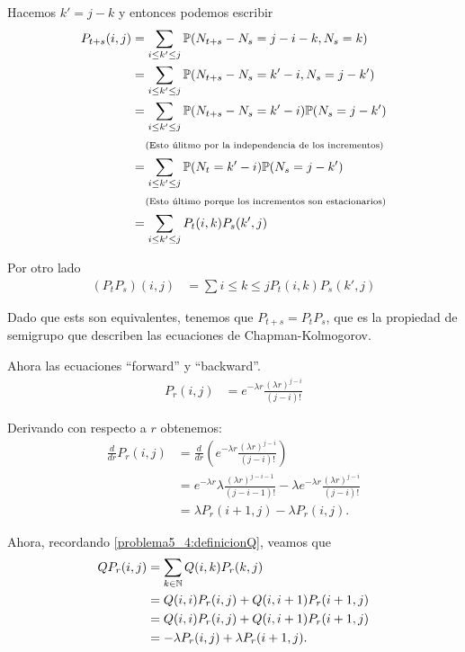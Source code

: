Hacemos $k' = j - k$ y entonces podemos escribir
\begin{align}
    P_{t+s}(i,j)    &=  \sum_{i \leq k' \leq j}\mathbb{P}(N_{t+s} - N_s = j-i-k, N_s = k)               \\    
                    &=  \sum_{i \leq k' \leq j}\mathbb{P}(N_{t+s} - N_s = k' - i, N_s = j - k')         \\    
                    &=  \sum_{i \leq k' \leq j}\mathbb{P}(N_{t+s} - N_s = k' - i)\mathbb{P}(N_s = j - k')       \\
                    &\;\;\;\;\mbox{{\scriptsize(Esto úlitmo por la independencia de los incrementos)}}              \\
                    &=  \sum_{i \leq k' \leq j}\mathbb{P}(N_{t} = k' - i)\mathbb{P}(N_s = j - k')               \\
                    &\;\;\;\;\mbox{{\scriptsize(Esto último porque los incrementos son estacionarios)}}             \\
                    &=  \sum_{i \leq k' \leq j} P_t(i,k) P_s(k',j)                              \\
\end{align}\pn

Por otro lado
\begin{align}
    (P_t P_s)(i,j)  &=  \sum{i \leq k \leq j}   P_t(i,k) P_s(k',j)
\end{align}

Dado que ests son equivalentes, tenemos que $P_{t+s} = P_t P_s$, que es la propiedad de semigrupo que describen
las ecuaciones de Chapman-Kolmogorov.\pn

Ahora las ecuaciones ``forward'' y ``backward''.
\begin{align}
    P_r(i, j)   &=  e^{-\lambda r}   \frac{(\lambda r)^{j - i}}{(j - i)!}
\end{align}\pn

Derivando con respecto a $r$ obtenemos:
\begin{align}
    \frac{d}{dr}    P_r(i, j)   &=  \frac{d}{dr} \left( e^{-\lambda r}   \frac{(\lambda r)^{j - i}}{(j - i)!}   \right)                                                         \\
                                &=  e^{-\lambda r} \lambda \frac{(\lambda r)^{j - i - 1}}{(j - i - 1)!} -\lambda e^{-\lambda r}   \frac{(\lambda r)^{j - i}}{(j - i)!}         \\
                                &=  \lambda P_r(i+1, j) - \lambda P_r(i,j).
\end{align}\pn

Ahora, recordando \eqref{problema5_4:definicionQ}, veamos que
\begin{align}
     QP_r(i,j)  &= \sum_{k \in \mathbb{N}} Q(i,k)P_r(k,j)           \\
                &= Q(i,i)P_r(i,j)   + Q(i, i+1)P_r(i+1,j)   \\
                &= Q(i,i)P_r(i,j)   + Q(i, i+1)P_r(i+1,j)   \\
                &=  -\lambda P_r(i,j) + \lambda P_r(i+1,j).
\end{align}\pn

